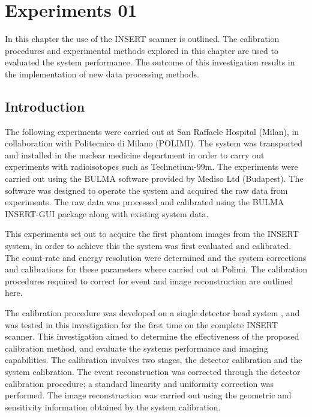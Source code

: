 \chapter{Experiments 01}
\label{chapterlabel}



In this chapter the use of the \acrshort{INSERT} scanner is outlined. The calibration procedures and experimental methods explored in this chapter are used to evaluated the system performance. The outcome of this investigation results in the implementation of new data processing methods. 

\section{Introduction}
The following experiments were carried out at San Raffaele Hospital (Milan), in collaboration with Politecnico di Milano (POLIMI). The system was transported and installed in the nuclear medicine department in order to carry out experiments with radioisotopes such as Technetium-99m. The experiments were carried out using the BULMA software provided by Mediso Ltd (Budapest). The software was designed to operate the system and acquired the raw data from experiments. The raw data was processed and calibrated using the BULMA INSERT-GUI package along with existing system data. 

This experiments set out to acquire the first phantom images from the \acrshort{INSERT} system, in order to achieve this the system was first evaluated and calibrated. The count-rate and energy resolution were determined and the system corrections and calibrations for these parameters where carried out at Polimi. The calibration procedures required to correct for event and image reconstruction are outlined here.

The calibration procedure was developed on a single detector head system \cite{DebCal}, and was tested in this investigation for the first time on the complete \acrshort{INSERT} scanner. This investigation aimed to determine the effectiveness of the proposed calibration method, and evaluate the systems performance and imaging capabilities. The calibration involves two stages, the detector calibration and the system calibration. The event reconstruction was corrected through the detector calibration procedure; a standard linearity and uniformity correction was performed. The image reconstruction was carried out using the geometric and sensitivity information obtained by the system calibration.

